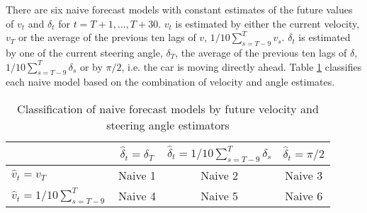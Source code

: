 \documentclass[12pt,a4paper]{article}\usepackage[]{graphicx}\usepackage[]{color}
\begin{document}
\begin{center}
\begin{table}[h]
\label{tableAlg}
\caption{Details of the algorithms used to produce posterior distributions for each method and prior combination}
\end{table}
\end{center}

There are six naive forecast models with constant estimates of the future values of $v_t$ and $\delta_t$ for $t = T+1, \dots, T+30$. $v_t$ is estimated by either the current velocity, $v_T$ or the average of the previous ten lags of $v$, $1/10 \sum_{s = T - 9}^T v_s$. $\delta_t$ is estimated by one of the current steering angle, $\delta_T$, the average of the previous ten lags of $\delta$, $1/10 \sum_{s = T - 9}^T \delta_s$ or by $\pi/2$, i.e. the car is moving directly ahead. Table \ref{tableNaive} classifies each naive model based on the combination of velocity and angle estimates.
\begin{table}
\begin{center}
\begin{tabular}{|l|c|c|c|}
\hline
& $\hat{\delta}_t = \delta_T$ & $\hat{\delta}_t = 1/10 \sum_{s=T-9}^T \delta_s$ & $\hat{\delta}_t = \pi/2$ \\
\hline
$\hat{v}_t = v_T$ & Naive 1 & Naive 2 & Naive 3 \\
$\hat{v}_t = 1/10\sum_{s=T-9}^T$ & Naive 4 & Naive 5 & Naive 6\\
\hline
\end{tabular}
\end{center}
\label{tableNaive}
\caption{Classification of naive forecast models by future velocity and steering angle estimators}
\end{table}
\end{document}
